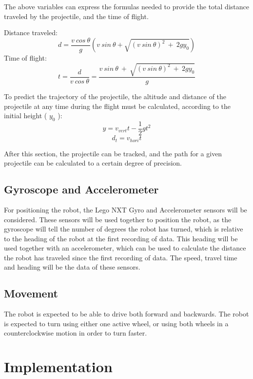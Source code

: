 The above variables can express the formulas needed to provide the total distance traveled by the projectile, and the time of flight.\newline

Distance traveled:
\[d = \dfrac{v \ cos \ \theta}{g}(v \ sin \ \theta + \sqrt{(v \ sin \ \theta)^2 \ + \ 2gy_{0}})\] \newline
Time of flight:
\[t = \dfrac{d}{v \ cos \ \theta} = \dfrac{v \ sin \ \theta \ + \ \sqrt{(v \ sin \ \theta)^2 \ + \ 2gy_{0}}}{g}\]
\newline

To predict the trajectory of the projectile, the altitude and distance of the projectile at any time during the flight must be calculated, according to the initial height ( \(y_{0}\) ):
\[y = v_{vert}t - \dfrac{1}{2} gt^2\]
\[d_{t} = v_{hori}t\]

After this section, the projectile can be tracked, and the path for a given projectile can be calculated to a certain degree of precision. 

\subsection{Gyroscope and Accelerometer}
\label{sec:i1Gyroscope and Accelerometer}
For positioning the robot, the Lego NXT Gyro and Accelerometer sensors will be considered. These sensors will be used together to position the robot, as the gyroscope will tell the number of degrees the robot has turned, which is relative to the heading of the robot at the first recording of data. This heading will be used together with an accelerometer, which can be used to calculate the distance the robot has traveled since the first recording of data. The speed, travel time and heading will be the data of these sensors.


\subsection{Movement}
\label{sec:i1Movement}
The robot is expected to be able to drive both forward and backwards. The robot is expected to turn using either one active wheel, or using both wheels in a counterclockwise motion in order to turn faster.


\section{Implementation}
\label{sec:i1Implementation}


